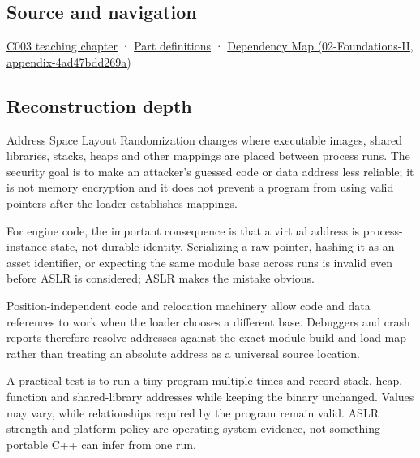 \subsection{Source and navigation}\label{source-and-navigation}

\href{Continuous\%20Notes/Computing\%20Foundations\%20-\%20From\%20Bits\%20to\%20C++\%20and\%20Systems\%20APIs\#Where\%20the\%20bytes\%20live}{C003 teaching chapter} · \hyperref[appendix-fd090d982a15]{Part definitions} · \href{}{Dependency Map (02-Foundations-II, appendix-4ad47bdd269a)}

\subsection{Reconstruction depth}\label{reconstruction-depth}

Address Space Layout Randomization changes where executable images, shared libraries, stacks, heaps and other mappings are placed between process runs. The security goal is to make an attacker's guessed code or data address less reliable; it is not memory encryption and it does not prevent a program from using valid pointers after the loader establishes mappings.

For engine code, the important consequence is that a virtual address is process-instance state, not durable identity. Serializing a raw pointer, hashing it as an asset identifier, or expecting the same module base across runs is invalid even before ASLR is considered; ASLR makes the mistake obvious.

Position-independent code and relocation machinery allow code and data references to work when the loader chooses a different base. Debuggers and crash reports therefore resolve addresses against the exact module build and load map rather than treating an absolute address as a universal source location.

A practical test is to run a tiny program multiple times and record stack, heap, function and shared-library addresses while keeping the binary unchanged. Values may vary, while relationships required by the program remain valid. ASLR strength and platform policy are operating-system evidence, not something portable C++ can infer from one run.

